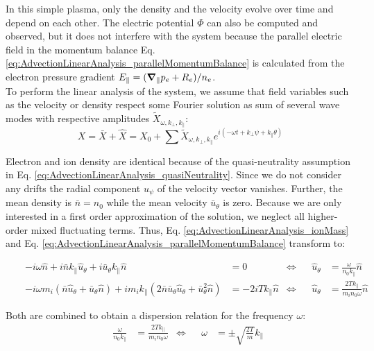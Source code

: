 In this simple plasma, only the density and the velocity evolve over time and depend on each other. The electric potential $\Phi$ can also be computed and observed, but it does not interfere with the system because the parallel electric field in the momentum balance Eq. \ref{eq:AdvectionLinearAnalysis_parallelMomentumBalance} is calculated from the electron pressure gradient $E_\parallel = (\grad_\parallel p_e + R_e) / n_e$. \\

To perform the linear analysis of the system, we assume that field variables such as the velocity or density respect some Fourier solution as sum of several wave modes with respective amplitudes $\tilde{X}_{\omega,k_\perp,k_\parallel}$:
\begin{equation}
	 X = \bar{X} + \hat{X} = X_0 + \sum\tilde{X}_{\omega,k_\perp,k_\parallel}e^{i(-\omega t + k_\perp \psi + k_\parallel \theta)} \label{eq:FourierModeSolution}
\end{equation}

Electron and ion density are identical because of the quasi-neutrality assumption in Eq. \ref{eq:AdvectionLinearAnalysis_quasiNeutrality}. Since we do not consider any drifts the radial component $u_\psi$ of the velocity vector vanishes. Further, the mean density is $\bar{n}=n_0$ while the mean velocity $\bar{u}_\theta$ is zero. Because we are only interested in a first order approximation of the solution, we neglect all higher-order mixed fluctuating terms. Thus, Eq. \ref{eq:AdvectionLinearAnalysis_ionMass} and Eq. \ref{eq:AdvectionLinearAnalysis_parallelMomentumBalance} transform to:

\begin{align*}
	&&-i\omega\hat{n} + i\bar{n}k_\parallel\hat{u}_\theta + i\bar{u}_\theta k_\parallel\hat{n} &= 0 &\Leftrightarrow&& \hat{u}_\theta &= \frac{\omega}{n_0k_\parallel}\hat{n} \\
	&& -i\omega m_i \left(\bar{n}\hat{u}_\theta + \bar{u}_\theta\hat{n}\right) + im_ik_\parallel\left(2\bar{n}\bar{u}_\theta\hat{u}_\theta + \bar{u}_\theta^2\hat{n}\right) &= -2iT k_\parallel\hat{n}	&\Leftrightarrow&&  \hat{u}_\theta &= \frac{2T k_\parallel}{m_in_0\omega}\hat{n}
\end{align*}

Both are combined to obtain a dispersion relation for the frequency $\omega$:
\begin{align}
	&& \frac{\omega}{n_0k_\parallel} &= \frac{2T k_\parallel}{m_in_0\omega} 
	&\Leftrightarrow&& \omega &= \pm\sqrt{\frac{2T}{m}}k_\parallel \label{eq:AdvectionLinearAnalysis_dispersionRelation}
\end{align}

